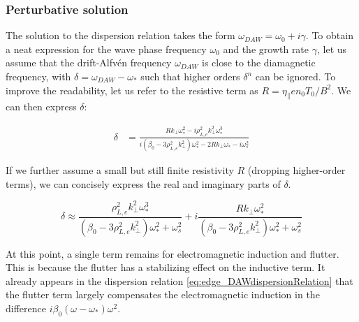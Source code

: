 \subsubsection{Perturbative solution}
\label{ssec:edge_DAW_perturbativeSolution}


The solution to the dispersion relation takes the form $\omega_{DAW} = \omega_0 +i\gamma$. To obtain a neat expression for the wave phase frequency $\omega_0$ and the growth rate $\gamma$, let us assume that the drift-Alfvén frequency $\omega_{DAW}$ is close to the diamagnetic frequency, with $\delta = \omega_{DAW} - \omega_*$ such that higher orders $\delta^n$ can be ignored. To improve the readability, let us refer to the resistive term as $R = \eta_\parallel en_0T_0/B^2$. We can then express $\delta$: 

\begin{align}
	\delta &= \frac{Rk_\perp\omega_*^2 - i\rho_{L,e}^2k_\perp^2\omega_*^3}{i\left(\beta_0 - 3\rho_{L,e}^2k_\perp^2\right)\omega_*^2 - 2Rk_\perp\omega_* - i\omega_s^2} %
\end{align}

If we further assume a small but still finite resistivity $R$ (dropping higher-order terms), we can concisely express the real and imaginary parts of $\delta$.

\begin{equation}
	\delta \approx \frac{\rho_{L,e}^2k_\perp^{2} \omega_*^{3} }{\left(\beta_{0}  - 3 \rho_{L,e}^2 k_\perp^{2}\right)\omega_*^{2} + \omega_s^{2}} + i\frac{Rk_\perp\omega_*^{2}}{\left(\beta_{0}  - 3 \rho_{L,e}^2 k_\perp^{2}\right)\omega_*^{2} + \omega_s^{2} }	
\end{equation}

At this point, a single term remains for electromagnetic induction and flutter. This is because the flutter has a stabilizing effect on the inductive term. It already appears in the dispersion relation \ref{eq:edge_DAWdispersionRelation} that the flutter term largely compensates the electromagnetic induction in the difference $i\beta_0\left(\omega - \omega_*\right)\omega^2$. 

